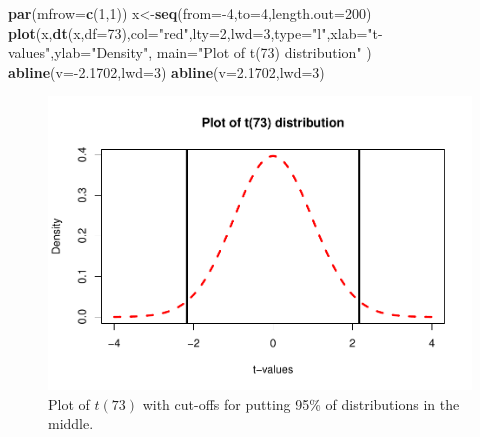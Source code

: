 \documentclass[]{book}
\newenvironment{Shaded}{\begin{snugshade}}{\end{snugshade}}
\newcommand{\KeywordTok}[1]{\textcolor[rgb]{0.13,0.29,0.53}{\textbf{{#1}}}}
\newcommand{\DataTypeTok}[1]{\textcolor[rgb]{0.13,0.29,0.53}{{#1}}}
\newcommand{\DecValTok}[1]{\textcolor[rgb]{0.00,0.00,0.81}{{#1}}}
\newcommand{\FloatTok}[1]{\textcolor[rgb]{0.00,0.00,0.81}{{#1}}}
\newcommand{\StringTok}[1]{\textcolor[rgb]{0.31,0.60,0.02}{{#1}}}
\newcommand{\NormalTok}[1]{{#1}}
\begin{document}
\begin{Shaded}
\begin{Highlighting}[]
\KeywordTok{par}\NormalTok{(}\DataTypeTok{mfrow=}\KeywordTok{c}\NormalTok{(}\DecValTok{1}\NormalTok{,}\DecValTok{1}\NormalTok{))}
\NormalTok{x<-}\KeywordTok{seq}\NormalTok{(}\DataTypeTok{from=}\NormalTok{-}\DecValTok{4}\NormalTok{,}\DataTypeTok{to=}\DecValTok{4}\NormalTok{,}\DataTypeTok{length.out=}\DecValTok{200}\NormalTok{)}
\KeywordTok{plot}\NormalTok{(x,}\KeywordTok{dt}\NormalTok{(x,}\DataTypeTok{df=}\DecValTok{73}\NormalTok{),}\DataTypeTok{col=}\StringTok{"red"}\NormalTok{,}\DataTypeTok{lty=}\DecValTok{2}\NormalTok{,}\DataTypeTok{lwd=}\DecValTok{3}\NormalTok{,}\DataTypeTok{type=}\StringTok{"l"}\NormalTok{,}\DataTypeTok{xlab=}\StringTok{"t-values"}\NormalTok{,}\DataTypeTok{ylab=}\StringTok{"Density"}\NormalTok{,}
     \DataTypeTok{main=}\StringTok{"Plot of t(73) distribution"} \NormalTok{)}
\KeywordTok{abline}\NormalTok{(}\DataTypeTok{v=}\NormalTok{-}\FloatTok{2.1702}\NormalTok{,}\DataTypeTok{lwd=}\DecValTok{3}\NormalTok{)}
\KeywordTok{abline}\NormalTok{(}\DataTypeTok{v=}\FloatTok{2.1702}\NormalTok{,}\DataTypeTok{lwd=}\DecValTok{3}\NormalTok{)}
\end{Highlighting}
\end{Shaded}

\begin{figure}[htbp]
\centering
\includegraphics{GreenwoodBanner_files/figure-latex/Figure2-20-1.pdf}
\caption{\label{fig:Figure2-20}Plot of \(t(73)\) with cut-offs for putting 95\% of
distributions in the middle.}
\end{figure}
\end{document}

